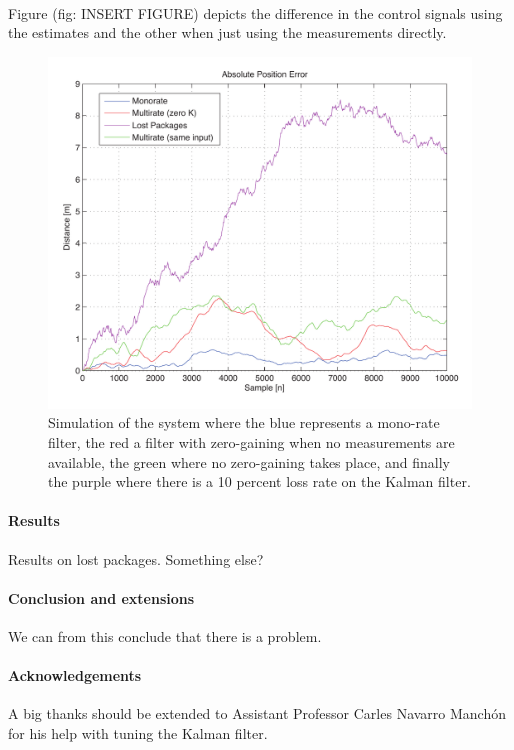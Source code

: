 \documentclass[a0,portrait]{a0poster}
\begin{document}
\begin{center}
{\paragraph{}
Figure (fig: INSERT FIGURE) depicts the difference in the control signals using the estimates and the other when just using the measurements directly.
\begin{figure}
	\centering %
	\includegraphics[width=\threecolwidth]{img/10percent}
  	\caption{Simulation of the system where the blue represents a mono-rate filter, the red a filter with zero-gaining when no measurements are available, the green where no zero-gaining takes place, and finally the purple where there is a 10 percent loss rate on the Kalman filter.}
	\label{fig:trends}
\end{figure}
\paragraph{Results}
Results on lost packages. 
Something else?
\paragraph{Conclusion and extensions}
We can from this conclude that there is a problem.
\paragraph{Acknowledgements} A big thanks should be extended to Assistant Professor Carles Navarro Manchón for his help with tuning the Kalman filter. 


}
\end{center}

\makefooter
\end{document}
